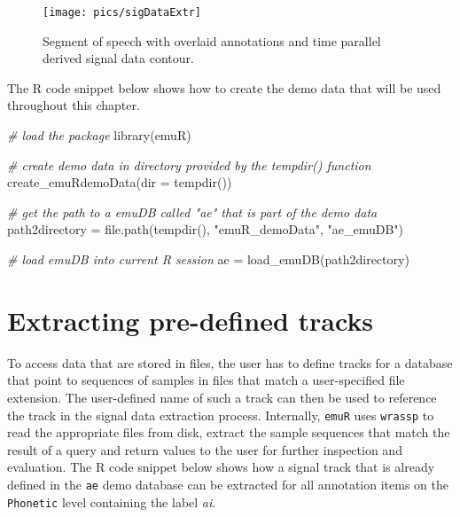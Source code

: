 \documentclass[
]{book}
\newenvironment{Shaded}{\begin{snugshade}}{\end{snugshade}}
\newcommand{\AttributeTok}[1]{\textcolor[rgb]{0.77,0.63,0.00}{#1}}
\newcommand{\CommentTok}[1]{\textcolor[rgb]{0.56,0.35,0.01}{\textit{#1}}}
\newcommand{\FunctionTok}[1]{\textcolor[rgb]{0.00,0.00,0.00}{#1}}
\newcommand{\NormalTok}[1]{#1}
\newcommand{\OtherTok}[1]{\textcolor[rgb]{0.56,0.35,0.01}{#1}}
\newcommand{\StringTok}[1]{\textcolor[rgb]{0.31,0.60,0.02}{#1}}
\begin{document}
\begin{figure}

{\centering \texttt{[image: pics/sigDataExtr]} 

}

\caption{Segment of speech with overlaid annotations and time parallel derived signal data contour.}\label{fig:sigDataExtr}
\end{figure}

The R code snippet below shows how to create the demo data that will be used throughout this chapter.

\begin{Shaded}
\begin{Highlighting}[]
\CommentTok{\# load the package}
\FunctionTok{library}\NormalTok{(emuR)}

\CommentTok{\# create demo data in directory provided by the tempdir() function}
\FunctionTok{create\_emuRdemoData}\NormalTok{(}\AttributeTok{dir =} \FunctionTok{tempdir}\NormalTok{())}

\CommentTok{\# get the path to a emuDB called "ae" that is part of the demo data}
\NormalTok{path2directory }\OtherTok{=} \FunctionTok{file.path}\NormalTok{(}\FunctionTok{tempdir}\NormalTok{(), }
                           \StringTok{"emuR\_demoData"}\NormalTok{, }
                           \StringTok{"ae\_emuDB"}\NormalTok{)}

\CommentTok{\# load emuDB into current R session}
\NormalTok{ae }\OtherTok{=} \FunctionTok{load\_emuDB}\NormalTok{(path2directory)}
\end{Highlighting}
\end{Shaded}

\hypertarget{extracting-pre-defined-tracks}{%
\section{Extracting pre-defined tracks}\label{extracting-pre-defined-tracks}}

To access data that are stored in files, the user has to define tracks for a database that point to sequences of samples in files that match a user-specified file extension. The user-defined name of such a track can then be used to reference the track in the signal data extraction process. Internally, \texttt{emuR} uses \texttt{wrassp} to read the appropriate files from disk, extract the sample sequences that match the result of a query and return values to the user for further inspection and evaluation. The R code snippet below shows how a signal track that is already defined in the \texttt{ae} demo database can be extracted for all annotation items on the \texttt{Phonetic} level containing the label \emph{ai}.
\end{document}
